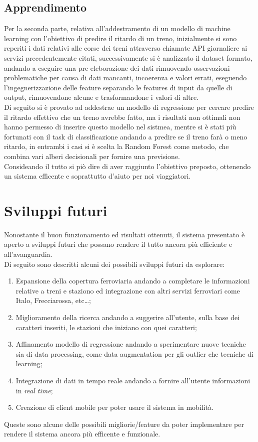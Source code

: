 \documentclass[italian,12pt,a4paper]{article}
\begin{document}
		\subsection{Apprendimento}
			Per la seconda parte, relativa all'addestramento di un modello di machine learning con l'obiettivo di predire il ritardo di un treno, inizialmente si sono reperiti i dati relativi alle corse dei treni attraverso chiamate API giornaliere ai servizi precedentemente citati, successivamente si è analizzato il dataset formato, andando a eseguire una pre-eleborazione dei dati rimuovendo osservazioni problematiche per causa di dati mancanti, incoerenza e valori errati, eseguendo l'ingegnerizzazione delle feature separando le features di input da quelle di output, rimuovendone alcune e trasformandone i valori di altre.\\
			Di seguito si è provato ad addestrae un modello di regressione per cercare predire il ritardo effettivo che un treno avrebbe fatto, ma i risultati non ottimali non hanno permesso di inserire questo modello nel sistmea, mentre si è stati più fortunati con il task di classificazione andando a predire se il treno farà o meno ritardo, in entrambi i casi si è scelta la Random Forest come metodo, che combina vari alberi decisionali per fornire una previsione. \\
			\linebreak
			Consideando il tutto si piò dire di aver raggiunto l'obiettivo preposto, ottenendo un sistema efficente e soprattutto d'aiuto per noi viaggiatori.

	
	\section{Sviluppi futuri}
		Nonostante il buon funzionamento ed risultati ottenuti, il sistema presentato è aperto a sviluppi futuri che possano rendere il tutto ancora più efficiente e all'avanguardia. \\
		\linebreak
		Di seguito sono descritti alcuni dei possibili sviluppi futuri da esplorare:
		
		\begin{enumerate}
			\item Espansione della copertura ferroviaria andando a completare le informazioni relative a treni e staziono ed integrazione con altri servizi ferroviari come Italo, Frecciarossa, etc\dots;
			\item Miglioramento della ricerca andando a suggerire all'utente, sulla base dei caratteri inseriti, le stazioni che iniziano con quei caratteri;
			\item Affinamento modello di regressione andando a sperimentare nuove tecniche sia di data processing, come data augmentation per gli outlier che tecniche di learning;
			\item Integrazione di dati in tempo reale andando a fornire all'utente informazioni in \textit{real time};
			\item Creazione di client mobile per poter usare il sistema in mobilità.
		\end{enumerate}
		
		Queste sono alcune delle possibili migliorie/feature da poter implementare per rendere il sistema ancora più efficente e funzionale.
		
		\printbibliography
	
\end{document}
